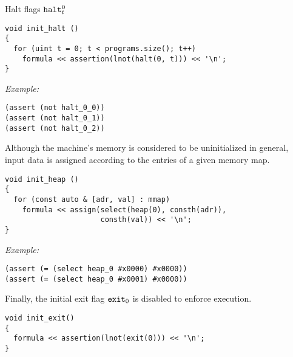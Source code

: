 
\noindent
Halt flags $\texttt{halt}^0_t$ 

\begin{lstlisting}[style=c++]
void init_halt ()
{
  for (uint t = 0; t < programs.size(); t++)
    formula << assertion(lnot(halt(0, t))) << '\n';
}
\end{lstlisting}

\noindent
\emph{Example:} 

\begin{lstlisting}[style=smtlib]
(assert (not halt_0_0))
(assert (not halt_0_1))
(assert (not halt_0_2))
\end{lstlisting}


\noindent
Although the machine's memory is considered to be uninitialized in general, input data is assigned according to the entries of a given memory map.

\begin{lstlisting}[style=c++]
void init_heap ()
{
  for (const auto & [adr, val] : mmap)
    formula << assign(select(heap(0), consth(adr)),
                      consth(val)) << '\n';
}
\end{lstlisting}

\noindent
\emph{Example:} 

\begin{lstlisting}[style=smtlib]
(assert (= (select heap_0 #x0000) #x0000))
(assert (= (select heap_0 #x0001) #x0000))
\end{lstlisting}


\noindent
Finally, the initial exit flag $\texttt{exit}_0$ is disabled to enforce execution.

\begin{lstlisting}[style=c++]
void init_exit()
{
  formula << assertion(lnot(exit(0))) << '\n';
}
\end{lstlisting}

